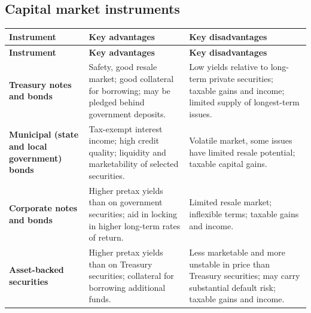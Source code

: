 \subsection{Capital market instruments}

\begin{center}
\scriptsize
\begin{longtable}{@{}p{2.9cm} p{5.3cm} p{5.3cm}@{}}
\toprule
\rowcolor{FRMSoft}\textbf{Instrument} & \textbf{Key advantages} & \textbf{Key disadvantages} \\
\midrule
\endfirsthead
\toprule
\rowcolor{FRMSoft}\textbf{Instrument} & \textbf{Key advantages} & \textbf{Key disadvantages} \\
\midrule
\endhead
\textbf{Treasury notes and bonds} \newline {\color{FRMGrey}$\star\star$} &
Safety, good resale market; good collateral for borrowing; may be pledged behind government deposits. &
Low yields relative to long-term private securities; taxable gains and income; limited supply of longest-term issues. \\
\addlinespace
\textbf{Municipal (state and local government) bonds} \newline {\color{FRMGrey}$\star\star$} &
Tax-exempt interest income; high credit quality; liquidity and marketability of selected securities. &
Volatile market, some issues have limited resale potential; taxable capital gains. \\
\addlinespace
\textbf{Corporate notes and bonds} \newline {\color{FRMGrey}$\star$} &
Higher pretax yields than on government securities; aid in locking in higher long-term rates of return. &
Limited resale market; inflexible terms; taxable gains and income. \\
\addlinespace
\textbf{Asset-backed securities} \newline {\color{FRMGrey}$\star$} &
Higher pretax yields than on Treasury securities; collateral for borrowing additional funds. &
Less marketable and more unstable in price than Treasury securities; may carry substantial default risk; taxable gains and income. \\
\bottomrule
\end{longtable}
\end{center}

